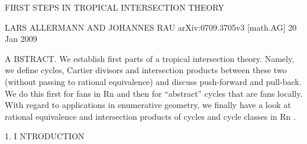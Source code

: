 \documentclass[
  11pt,
]{article}
\newenvironment{Shaded}{}{}
\newcommand{\NormalTok}[1]{#1}
\begin{document}
\begin{Shaded}
\begin{Highlighting}[]
\NormalTok{                                                       FIRST STEPS IN TROPICAL INTERSECTION THEORY}

\NormalTok{                                                                       LARS ALLERMANN AND JOHANNES RAU}
\NormalTok{arXiv:0709.3705v3 [math.AG] 20 Jan 2009}




\NormalTok{                                                   A BSTRACT. We establish first parts of a tropical intersection theory. Namely, we define}
\NormalTok{                                                   cycles, Cartier divisors and intersection products between these two (without passing to}
\NormalTok{                                                   rational equivalence) and discuss push{-}forward and pull{-}back. We do this first for fans}
\NormalTok{                                                   in Rn and then for “abstract” cycles that are fans locally. With regard to applications}
\NormalTok{                                                   in enumerative geometry, we finally have a look at rational equivalence and intersection}
\NormalTok{                                                   products of cycles and cycle classes in Rn .}




\NormalTok{                                                                                  1. I NTRODUCTION}


\end{Highlighting}
\end{Shaded}
\end{document}

